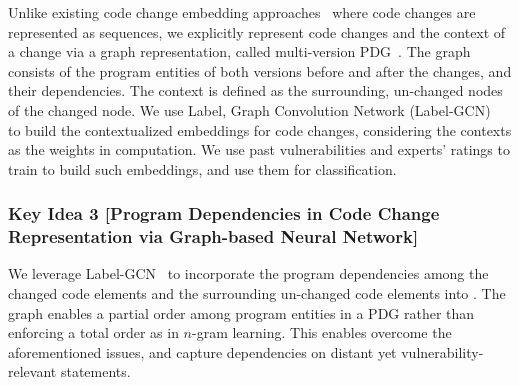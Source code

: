 Unlike existing code change embedding
approaches~\cite{cc2vec,commit2vec} where code changes are represented
as sequences, we explicitly represent code changes and the
context of a change via a graph representation, called multi-version
PDG~\cite{flexeme-fse20}. The graph consists of
the program entities of both versions before and after the changes,
and their dependencies. The context is defined as the surrounding,
un-changed nodes of the changed node.
%
We use Label, Graph Convolution Network (Label-GCN)~\cite{label-gcn}
to build the contextualized embeddings for code changes, considering
the contexts as the weights in computation.
%
We use past vulnerabilities and experts' ratings to train {\tool}
to build such embeddings, and use them for classification.
%





\subsubsection{{\bf Key Idea 3} [Program Dependencies in Code Change Representation via Graph-based Neural Network]}
We leverage Label-GCN~\cite{label-gcn} to incorporate the program dependencies among
the changed code elements and the surrounding un-changed code elements into {\tool}.
%
The graph enables a partial order among program entities in a PDG
rather than enforcing a total order as in $n$-gram learning.
%
This enables {\tool} overcome the aforementioned issues, 
and capture
dependencies on distant yet vulnerability-relevant statements.




